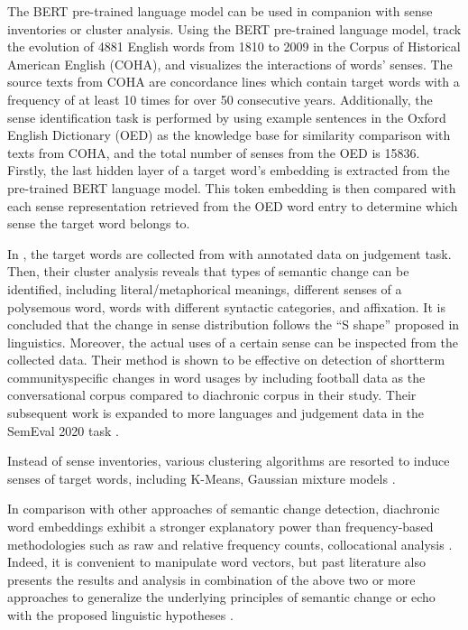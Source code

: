 The BERT pre-trained language model can be used in companion with sense inventories or cluster analysis. Using the BERT pre-trained language model, \textcite{hu2019diachronic} track the evolution of 4881 English words from 1810 to 2009 in the Corpus of Historical American English (COHA), and visualizes the interactions of words' senses. The source texts from COHA are concordance lines which contain target words with a frequency of at least 10 times for over 50 consecutive years. Additionally, the sense identification task is performed by using example sentences in the Oxford English Dictionary (OED) as the knowledge base for similarity comparison with texts from COHA, and the total number of senses from the OED is 15836. Firstly, the last hidden layer of a target word's embedding is extracted from the pre-trained BERT language model. This token embedding is then compared with each sense representation retrieved from the OED word entry to determine which sense the target word belongs to.

In \textcite{giulianelli2019lexical}, the target words are collected from \textcite{gulordava2011distributional} with annotated data on judgement task. Then, their cluster analysis reveals that types of semantic change can be identified, including literal/metaphorical meanings, different senses of a polysemous word, words with different syntactic categories, and affixation. It is concluded that the change in sense distribution follows the ``S shape'' proposed in linguistics. Moreover, the actual uses of a certain sense can be inspected from the collected data. Their method is shown to be effective on detection of short\text{-}term community\text{-}specific changes in word usages by including football data as the conversational corpus compared to diachronic corpus in their study. Their subsequent work is expanded to more languages and judgement data in the SemEval 2020 task \parencite{kutuzov2020uio}.

Instead of sense inventories, various clustering algorithms are resorted to induce senses of target words, including K-Means, Gaussian mixture models \parencite{giulianelli2019lexical}.

In comparison with other approaches of semantic change detection, diachronic word embeddings exhibit a stronger explanatory power than frequency-based methodologies such as raw and relative frequency counts, collocational analysis \parencite{kutuzov2018survey}. Indeed, it is convenient to manipulate word vectors, but past literature also presents the results and analysis in combination of the above two or more approaches to generalize the underlying principles of semantic change or echo with the proposed linguistic hypotheses \parencite{tahmasebi2018survey}.%

